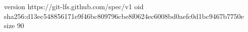 version https://git-lfs.github.com/spec/v1
oid sha256:d13ec548856171e9f46bc809796cbe8f0624ec6008bd0aefc0d1bc9467b7750e
size 90
